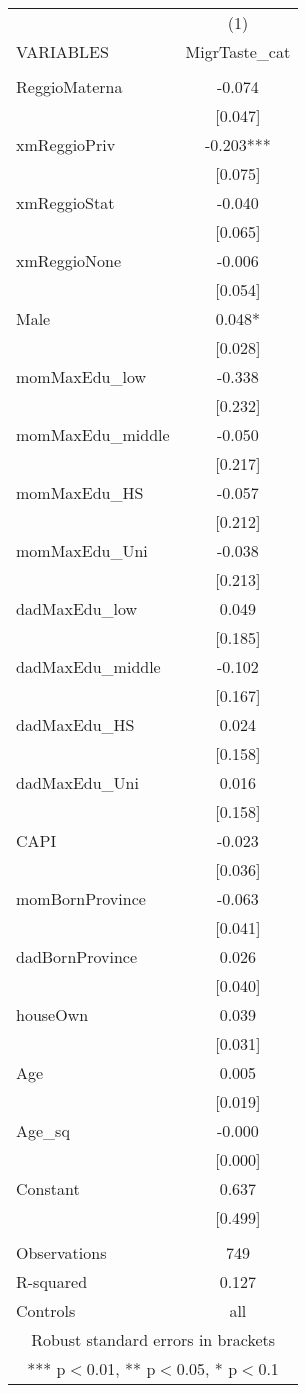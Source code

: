 \documentclass[]{article}
\begin{document}
\begin{tabular}{lc} \hline
 & (1) \\
VARIABLES & MigrTaste\_cat \\ \hline
 &  \\
ReggioMaterna & -0.074 \\
 & [0.047] \\
xmReggioPriv & -0.203*** \\
 & [0.075] \\
xmReggioStat & -0.040 \\
 & [0.065] \\
xmReggioNone & -0.006 \\
 & [0.054] \\
Male & 0.048* \\
 & [0.028] \\
momMaxEdu\_low & -0.338 \\
 & [0.232] \\
momMaxEdu\_middle & -0.050 \\
 & [0.217] \\
momMaxEdu\_HS & -0.057 \\
 & [0.212] \\
momMaxEdu\_Uni & -0.038 \\
 & [0.213] \\
dadMaxEdu\_low & 0.049 \\
 & [0.185] \\
dadMaxEdu\_middle & -0.102 \\
 & [0.167] \\
dadMaxEdu\_HS & 0.024 \\
 & [0.158] \\
dadMaxEdu\_Uni & 0.016 \\
 & [0.158] \\
CAPI & -0.023 \\
 & [0.036] \\
momBornProvince & -0.063 \\
 & [0.041] \\
dadBornProvince & 0.026 \\
 & [0.040] \\
houseOwn & 0.039 \\
 & [0.031] \\
Age & 0.005 \\
 & [0.019] \\
Age\_sq & -0.000 \\
 & [0.000] \\
Constant & 0.637 \\
 & [0.499] \\
 &  \\
Observations & 749 \\
R-squared & 0.127 \\
 Controls & all \\ \hline
\multicolumn{2}{c}{ Robust standard errors in brackets} \\
\multicolumn{2}{c}{ *** p$<$0.01, ** p$<$0.05, * p$<$0.1} \\
\end{tabular}
\end{document}
